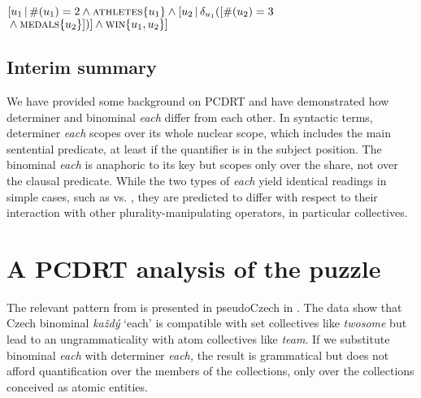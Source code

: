 \documentclass[output=paper,colorlinks,citecolor=brown,newtxmath]{langscibook}
\begin{document}
\ea
\([u_1\,|\,\#(u_1)=2 \wedge \textsc{athletes}\{u_1\} \wedge [u_2\,|\,\delta_{u_1}([\#(u_2)=3\)\\\({}\wedge \textsc{medals}\{u_2\}])] \wedge \textsc{win}\{u_1,u_2\}]\)\label{ex:two-athletes-3-prizes}
\z

\subsection{Interim summary}

We have provided some background on PCDRT and have demonstrated how determiner and binominal \textit{each} differ from each other. In syntactic terms, determiner \textit{each} scopes over its whole nuclear scope, which includes the main sentential predicate, at least if the quantifier is in the subject position. The binominal \textit{each} is anaphoric to its key but scopes only over the share, not over the clausal predicate. While the two types of \textit{each} yield identical readings in simple cases, such as  vs. , they are predicted to differ with respect to their interaction with other plurality-manipulating operators, in particular collectives.


\section{A PCDRT analysis of the puzzle}\label{main-data-puzzle}

\largerpage
The relevant pattern from  is presented in pseudoCzech in . The data show that Czech binominal \textit{každý} `each' is compatible with set collectives like \textit{twosome} but lead to an ungrammaticality with atom collectives like \textit{team}. If we substitute binominal \textit{each} with determiner \textit{each,} the result is grammatical but does not afford quantification over the members of the collections, only over the collections conceived as atomic entities.

\ea\label{ex:puzzle-psCzech} 
\z\z
\end{document}

